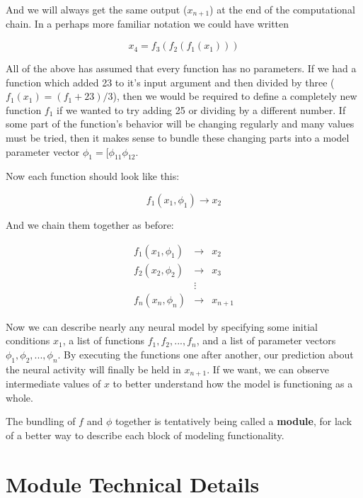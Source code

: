 \documentclass{article}
\newcommand{\definition}[1]{\textbf{#1}}
\begin{document}
And we will always get the same output ($x_{n+1}$) at the end of the computational chain. In a perhaps more familiar notation we could have written

\begin{equation}
x_{4} = f_3(f_2(f_1(x_1)))
\end{equation}

All of the above has assumed that every function has no parameters. If we had a function which added 23 to it's input argument and then divided by three ($f_1(x_1) = (f_1 + 23) / 3 $), then we would be required to define a completely new function $f_1$ if we wanted to try adding 25 or dividing by a different number. If some part of the function's behavior will be changing regularly and many values must be tried, then it makes sense to bundle these changing parts into a model parameter vector $\phi_1 = [\phi_{11} \phi_{12}$. 

Now each function should look like this:

\begin{equation}
  f_1(x_1, \phi_1) \rightarrow x_2
\end{equation}

And we chain them together as before:

\begin{eqnarray*}
f_{1}(x_{1}, \phi_1) & \rightarrow & x_{2}\\
f_{2}(x_{2}, \phi_2) & \rightarrow & x_{3}\\
 & \vdots\\
f_{n}(x_{n}, \phi_n) & \rightarrow & x_{n+1}
\end{eqnarray*}

Now we can describe nearly any neural model by specifying some initial conditions $x_1$, a list of functions $f_1, f_2, ..., f_n$, and a list of parameter vectors $\phi_1, \phi_2, ..., \phi_n$. By executing the functions one after another, our prediction about the neural activity will finally be held in $x_{n+1}$. If we want, we can observe intermediate values of $x$ to better understand how the model is functioning as a whole. 

The bundling of $f$ and $\phi$ together is tentatively being called a \definition{module}, for lack of a better way to describe each block of modeling functionality. 

\section{Module Technical Details}
\end{document}
